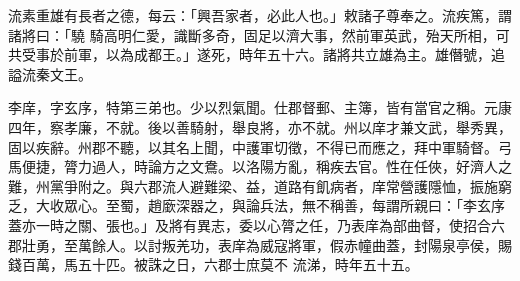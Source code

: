 \begin{pinyinscope}
 流素重雄有長者之德，每云：「興吾家者，必此人也。」敕諸子尊奉之。流疾篤，謂諸將曰：「驍
 騎高明仁愛，識斷多奇，固足以濟大事，然前軍英武，殆天所相，可共受事於前軍，以為成都王。」遂死，時年五十六。諸將共立雄為主。雄僭號，追謚流秦文王。



 李庠，字玄序，特第三弟也。少以烈氣聞。仕郡督郵、主簿，皆有當官之稱。元康四年，察孝廉，不就。後以善騎射，舉良將，亦不就。州以庠才兼文武，舉秀異，固以疾辭。州郡不聽，以其名上聞，中護軍切徵，不得已而應之，拜中軍騎督。弓馬便捷，膂力過人，時論方之文鴦。以洛陽方亂，稱疾去官。性在任俠，好濟人之難，州黨爭附之。與六郡流人避難梁、益，道路有飢病者，庠常營護隱恤，振施窮
 乏，大收眾心。至蜀，趙廞深器之，與論兵法，無不稱善，每謂所親曰：「李玄序蓋亦一時之關、張也。」及將有異志，委以心膂之任，乃表庠為部曲督，使招合六郡壯勇，至萬餘人。以討叛羌功，表庠為威寇將軍，假赤幢曲蓋，封陽泉亭侯，賜錢百萬，馬五十匹。被誅之日，六郡士庶莫不
 流涕，時年五十五。



\end{pinyinscope}